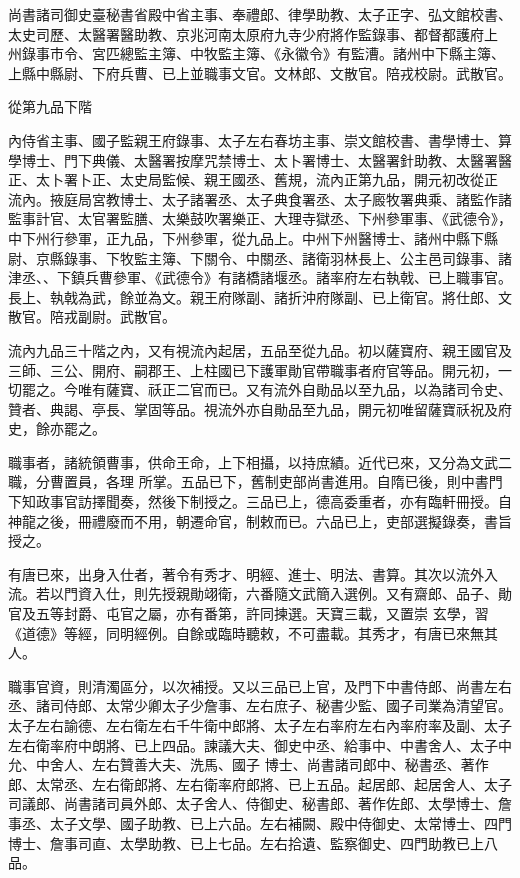 \begin{pinyinscope}
 尚書諸司御史臺秘書省殿中省主事、奉禮郎、律學助教、太子正字、弘文館校書、太史司歷、太醫署醫助教、京兆河南太原府九寺少府將作監錄事、都督都護府上
 州錄事市令、宮匹總監主簿、中牧監主簿、《永徽令》有監漕。諸州中下縣主簿、上縣中縣尉、下府兵曹、已上並職事文官。文林郎、文散官。陪戎校尉。武散官。



 從第九品下階



 內侍省主事、國子監親王府錄事、太子左右春坊主事、崇文館校書、書學博士、算學博士、門下典儀、太醫署按摩咒禁博士、太卜署博士、太醫署針助教、太醫署醫正、太卜署卜正、太史局監候、親王國丞、舊規，流內正第九品，開元初改從正
 流內。掖庭局宮教博士、太子諸署丞、太子典食署丞、太子廄牧署典乘、諸監作諸監事計官、太官署監膳、太樂鼓吹署樂正、大理寺獄丞、下州參軍事、《武德令》，中下州行參軍，正九品，下州參軍，從九品上。中州下州醫博士、諸州中縣下縣尉、京縣錄事、下牧監主簿、下關令、中關丞、諸衛羽林長上、公主邑司錄事、諸津丞、、下鎮兵曹參軍、《武德令》有諸橋諸堰丞。諸率府左右執戟、已上職事官。長上、執戟為武，餘並為文。親王府隊副、諸折沖府隊副、已上衛官。將仕郎、文散官。陪戎副尉。武散官。



 流內九品三十階之內，又有視流內起居，五品至從九品。初以薩寶府、親王國官及三師、三公、開府、嗣郡王、上柱國已下護軍勛官帶職事者府官等品。開元初，一切罷之。今唯有薩寶、祅正二官而已。又有流外自勛品以至九品，以為諸司令史、贊者、典謁、亭長、掌固等品。視流外亦自勛品至九品，開元初唯留薩寶祅祝及府史，餘亦罷之。



 職事者，諸統領曹事，供命王命，上下相攝，以持庶績。近代已來，又分為文武二職，分曹置員，各理
 所掌。五品已下，舊制吏部尚書進用。自隋已後，則中書門下知政事官訪擇聞奏，然後下制授之。三品已上，德高委重者，亦有臨軒冊授。自神龍之後，冊禮廢而不用，朝遷命官，制敕而已。六品已上，吏部選擬錄奏，書旨授之。



 有唐已來，出身入仕者，著令有秀才、明經、進士、明法、書算。其次以流外入流。若以門資入仕，則先授親勛翊衛，六番隨文武簡入選例。又有齋郎、品子、勛官及五等封爵、屯官之屬，亦有番第，許同揀選。天寶三載，又置崇
 玄學，習《道德》等經，同明經例。自餘或臨時聽敕，不可盡載。其秀才，有唐已來無其人。



 職事官資，則清濁區分，以次補授。又以三品已上官，及門下中書侍郎、尚書左右丞、諸司侍郎、太常少卿太子少詹事、左右庶子、秘書少監、國子司業為清望官。太子左右諭德、左右衛左右千牛衛中郎將、太子左右率府左右內率府率及副、太子左右衛率府中朗將、已上四品。諫議大夫、御史中丞、給事中、中書舍人、太子中允、中舍人、左右贊善大夫、洗馬、國子
 博士、尚書諸司郎中、秘書丞、著作郎、太常丞、左右衛郎將、左右衛率府郎將、已上五品。起居郎、起居舍人、太子司議郎、尚書諸司員外郎、太子舍人、侍御史、秘書郎、著作佐郎、太學博士、詹事丞、太子文學、國子助教、已上六品。左右補闕、殿中侍御史、太常博士、四門博士、詹事司直、太學助教、已上七品。左右拾遺、監察御史、四門助教已上八品。




\end{pinyinscope}
